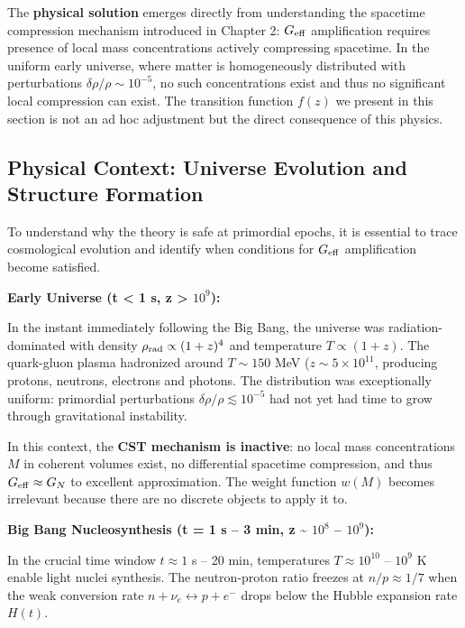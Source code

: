\documentclass[10pt,a4paper]{article}
\begin{document}
The \textbf{physical solution} emerges directly from understanding the
spacetime compression mechanism introduced in Chapter 2: \(G_{\rm eff}\)
amplification requires presence of local mass concentrations actively
compressing spacetime. In the uniform early universe, where matter is
homogeneously distributed with perturbations
\(\delta\rho/\rho \sim 10^{-5}\), no such concentrations exist and thus
no significant local compression can exist. The transition function
\(f(z)\) we present in this section is not an ad hoc adjustment but the
direct consequence of this physics.

\subsection{Physical Context: Universe Evolution and Structure
Formation}\label{physical-context-universe-evolution-and-structure-formation}

To understand why the theory is safe at primordial epochs, it is
essential to trace cosmological evolution and identify when conditions
for \(G_{\rm eff}\) amplification become satisfied.

\textbf{Early Universe (t \textless{} 1 s, z \textgreater{} $10^{9}$):}

In the instant immediately following the Big Bang, the universe was
radiation-dominated with density \(\rho_{\rm rad} \propto (1+z)^4\) and
temperature \(T \propto (1+z)\). The quark-gluon plasma hadronized
around \(T \sim 150\) MeV (\(z \sim 5 \times 10^{11}\), producing
protons, neutrons, electrons and photons. The distribution was
exceptionally uniform: primordial perturbations
\(\delta\rho/\rho \lesssim 10^{-5}\) had not yet had time to grow
through gravitational instability.

In this context, the \textbf{CST mechanism is inactive}: no local mass
concentrations \(M\) in coherent volumes exist, no differential
spacetime compression, and thus \(G_{\rm eff} \approx G_N\) to excellent
approximation. The weight function \(w(M)\) becomes irrelevant because
there are no discrete objects to apply it to.

\textbf{Big Bang Nucleosynthesis (t = 1 s -- 3 min, z \textasciitilde{}
$10^{8}$ -- $10^{9}$):}

In the crucial time window \(t \approx 1\) s -- 20 min, temperatures
\(T \approx 10^{10}\) -- \(10^9\) K enable light nuclei synthesis. The
neutron-proton ratio freezes at \(n/p \approx 1/7\) when the weak
conversion rate \(n + \nu_e \leftrightarrow p + e^-\) drops below the
Hubble expansion rate \(H(t)\).
\end{document}
